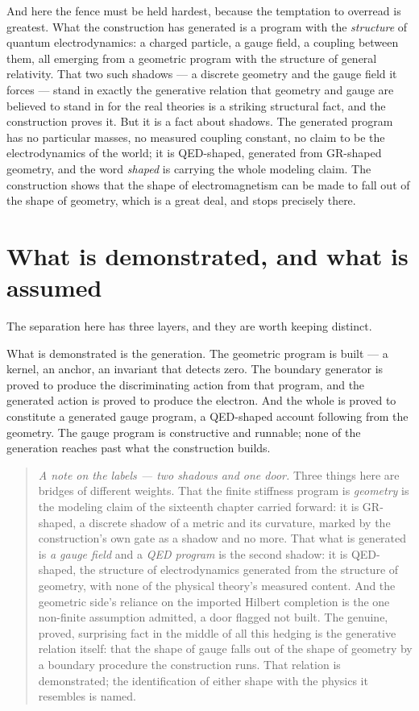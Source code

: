 And here the fence must be held hardest, because the temptation to overread is greatest. What the
construction has generated is a program with the \emph{structure} of quantum electrodynamics: a charged
particle, a gauge field, a coupling between them, all emerging from a geometric program with the
structure of general relativity. That two such shadows --- a discrete geometry and the gauge field it
forces --- stand in exactly the generative relation that geometry and gauge are believed to stand in for
the real theories is a striking structural fact, and the construction proves it. But it is a fact about
shadows. The generated program has no particular masses, no measured coupling constant, no claim to be
the electrodynamics of the world; it is QED-shaped, generated from GR-shaped geometry, and the word
\emph{shaped} is carrying the whole modeling claim. The construction shows that the shape of
electromagnetism can be made to fall out of the shape of geometry, which is a great deal, and stops
precisely there.

\section{What is demonstrated, and what is assumed}
\label{se:demonstrated-assumed-ch20}

The separation here has three layers, and they are worth keeping distinct.

What is demonstrated is the generation. The geometric program is built --- a kernel, an anchor, an
invariant that detects zero. The boundary generator is proved to produce the discriminating action from
that program, and the generated action is proved to produce the electron. And the whole is proved to
constitute a generated gauge program, a QED-shaped account following from the geometry. The gauge program
is constructive and runnable; none of the generation reaches past what the construction builds.

\begin{quote}
\emph{A note on the labels --- two shadows and one door.} Three things here are bridges of different
weights. That the finite stiffness program is \emph{geometry} is the modeling claim of the sixteenth
chapter carried forward: it is GR-shaped, a discrete shadow of a metric and its curvature, marked by the
construction's own gate as a shadow and no more. That what is generated is \emph{a gauge field} and a
\emph{QED program} is the second shadow: it is QED-shaped, the structure of electrodynamics generated
from the structure of geometry, with none of the physical theory's measured content. And the geometric
side's reliance on the imported Hilbert completion is the one non-finite assumption admitted, a door
flagged not built. The genuine, proved, surprising fact in the middle of all this hedging is the
generative relation itself: that the shape of gauge falls out of the shape of geometry by a boundary
procedure the construction runs. That relation is demonstrated; the identification of either shape with
the physics it resembles is named.
\end{quote}

